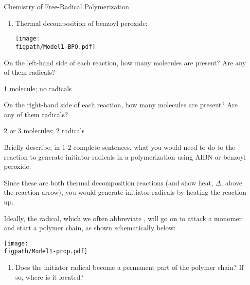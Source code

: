 \begin{activity}{Chemistry of Free-Radical Polymerization}
\begin{model}[Initiation]
\begin{enumerate}
		\item Thermal decomposition of benzoyl peroxide:
	
			\centerline{\texttt{[image: \\figpath/Model1-BPO.pdf]}}
			
	\end{enumerate}
	
	
\end{model}


\begin{ctqs}

	\question On the left-hand side of each reaction, how many molecules are present?  Are any of them radicals?
	
		\begin{solution}[0.5in]
		
			1 molecule; no radicals
			
		\end{solution}
	
	\question On the right-hand side of each reaction, how many molecules are present? Are any of them radicals?
	
		\begin{solution}[0.5in]
		
			2 or 3 molecules; 2 radicals
			
		\end{solution}
	
	\question Briefly describe, in 1-2 complete sentences, what you would need to do to the reaction to generate initiator radicals in a polymerization using AIBN or benzoyl peroxide.
	
		\begin{solution}[1.5in]
			Since these are both thermal decomposition reactions (and show heat, $\Delta$, above the reaction arrow), you would generate initiator radicals by heating the reaction up.
		\end{solution}
		
	\question Ideally, the radical, which we often abbreviate , will go on to attack a monomer and start a polymer chain, as shown schematically below:
	
			\centerline{\texttt{[image: \\figpath/Model1-prop.pdf]}}
	
		\begin{enumerate}
			\item Does the initiator radical become a permanent part of the polymer chain?  If so, where is it located?
	

\end{enumerate}
\end{ctqs}
\end{activity}
